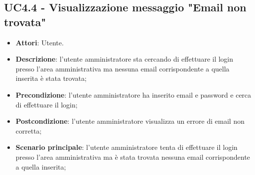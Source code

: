 \documentclass[../AnalisiDeiRequisiti_v4.0.0.tex]{subfiles}
\begin{document}
\subsection{UC4.4 - Visualizzazione messaggio "Email non trovata"} 
\label{sssec:UC4.4} 
\begin{itemize} 
\item \textbf{Attori}: Utente.
\item \textbf{Descrizione}: l'utente amministratore sta cercando di effettuare il login presso l'area amministrativa ma nessuna email corrispondente a quella inserita è stata trovata;
\item \textbf{Precondizione}: l'utente amministratore ha inserito email e password e cerca di effettuare il login;
\item \textbf{Postcondizione}: l'utente amministratore visualizza un errore di email non corretta;
\item \textbf{Scenario principale}: l'utente amministratore tenta di effettuare il login presso l'area amministrativa ma è stata trovata nessuna email corrispondente a quella inserita;
\newpage
\end{itemize} 
\end{document}
